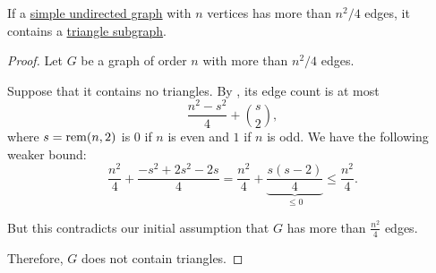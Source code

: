 \begin{theorem}\label{thm:mantels_theorem}
  If a \hyperref[def:undirected_graph]{simple undirected graph} with \( n \) vertices has more than \( n^2 / 4 \) edges, it contains a \hyperref[def:triangle_graph]{triangle subgraph}.
\end{theorem}
\begin{proof}
  Let \( G \) be a graph of order \( n \) with more than \( n^2 / 4 \) edges.

  Suppose that it contains no triangles. By , its edge count is at most
  \begin{equation*}
    \frac {n^2 - s^2} 4 + \binom s 2,
  \end{equation*}
  where \( s = \operatorname{rem}(n, 2) \) is \( 0 \) if \( n \) is even and \( 1 \) if \( n \) is odd. We have the following weaker bound:
  \begin{equation*}
    \frac {n^2} 4 + \frac {-s^2 + 2s^2 - 2s} 4
    =
    \frac {n^2} 4 + \underbrace{\frac {s(s - 2)} 4}_{\leq 0}
    \leq
    \frac {n^2} 4.
  \end{equation*}

  But this contradicts our initial assumption that \( G \) has more than \( \frac {n^2} 4 \) edges.

  Therefore, \( G \) does not contain triangles.
\end{proof}
